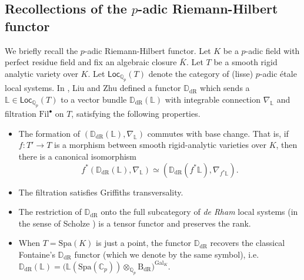 \documentclass[11pt, letterpaper]{amsart}
\theoremstyle{plain}
\theoremstyle{definition}
\newcommand{\IC}{\mathbb{C}}
\newcommand{\ID}{\mathbb{D}}
\newcommand{\IL}{\mathbb{L}}
\newcommand{\IQ}{\mathbb{Q}}
\newcommand\tensor{{\otimes}}
\newcommand{\<}{\langle}
\renewcommand{\>}{\rangle}
\newcommand{\Gal}{\mathrm{Gal}}
\newcommand{\dR}{\mathrm{dR}}
\newcommand{\Loc}{\mathsf{Loc}}
\newcommand{\Fil}{\mathrm{Fil}}
\begin{document}

\subsection{Recollections of the $p$-adic Riemann-Hilbert functor}

We briefly recall the $p$-adic Riemann-Hilbert functor. Let $K$ be a $p$-adic field with perfect residue field and fix an algebraic closure $\bar{K}$. Let $T$ be a smooth rigid analytic variety over $K$. Let $\Loc_{\IQ_p}(T)$ denote the category of (lisse) $p$-adic \'etale local systems. 
In \cite[Thm.~3.9]{LiuZhu}, Liu and Zhu defined a functor $\ID_\dR$ which sends a $\IL \in \Loc_{\IQ_p}(T)$ to a vector bundle $\ID_\dR(\IL)$ with integrable connection $\nabla_\IL$ and filtration $\Fil^\bullet$ on $T$, 
satisfying the following properties.
\begin{itemize}
    \item The formation of $(\ID_\dR(\IL), \nabla_\IL)$ commutes with base change. That is, if $f : T' \to T$ is a morphism between smooth rigid-analytic varieties over $K$, then there is a canonical isomorphism 
\begin{equation}
    \label{eqn: DdR commutes with base change}
    f^* (\ID_\dR(\IL), \nabla_\IL) \simeq (\ID_\dR(f^* \IL), \nabla_{f^* \IL}).
\end{equation}
\item The filtration satisfies Griffiths transversality.
\item The restriction of $\ID_\dR$ onto the full subcategory of \textit{de Rham} local systems (in the sense of Scholze \cite[Def.~8.3]{Sch13}) is a tensor functor and preserves the rank.
\item When $T = \mathrm{Spa}(K)$ is just a point, the functor $\ID_\dR$ recovers the classical Fontaine's $\ID_\dR$ functor (which we denote by the same symbol), i.e. $\ID_\dR(\IL) = \bigl(\IL(\mathrm{Spa}(\IC_p)) \tensor_{\IQ_p} \mathrm{B}_\dR \bigr)^{\Gal_K}$. 
\end{itemize}
\end{document}
